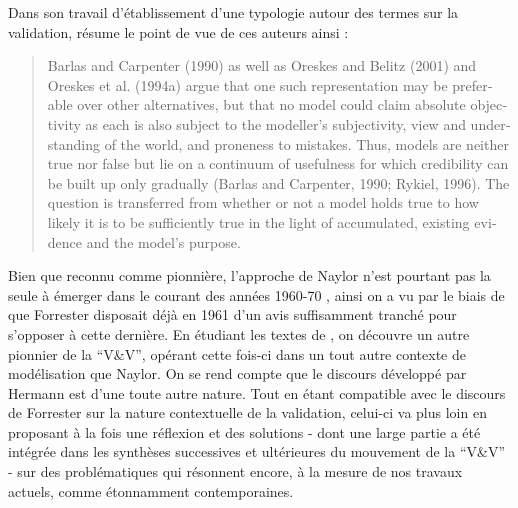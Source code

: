 Dans son travail d'établissement d'une typologie autour des termes sur la validation, \textcite{Augusiak2014} résume le point de vue de ces auteurs ainsi :

\foreignblockquote{english}[\cite{Augusiak2014}]{Barlas and Carpenter (1990) as well as Oreskes and Belitz (2001) and Oreskes et al. (1994a) argue that one such representation may be preferable over other alternatives, but that no model could claim absolute objectivity as each is also subject to the modeller’s subjectivity, view and understanding of the world, and proneness to mistakes. Thus, models are neither true nor false but lie on a continuum of usefulness for which credibility can be built up only gradually (Barlas and Carpenter, 1990; Rykiel, 1996). The question is transferred from whether or not a model holds true to how likely it is to be sufficiently true in the light of accumulated, existing evidence and the model’s purpose.}






Bien que reconnu comme pionnière, l'approche de Naylor n'est pourtant pas la seule à émerger dans le courant des années 1960-70 \autocite{Balci1980}, ainsi on a vu par le biais de \autocite{Barlas1990} que Forrester disposait déjà en 1961 d'un avis suffisamment tranché pour s'opposer à cette dernière. En étudiant les textes de \textcite{Hermann1967}, on découvre un autre pionnier de la \enquote{V\&V}, opérant cette fois-ci dans un tout autre contexte de modélisation que Naylor. On se rend compte que le discours développé par Hermann est d'une toute autre nature. Tout en étant compatible avec le discours de Forrester sur la nature contextuelle de la validation, celui-ci va plus loin en proposant à la fois une réflexion et des solutions - dont une large partie a été intégrée dans les synthèses successives et ultérieures du mouvement de la \enquote{V\&V} - sur des problématiques qui résonnent encore, à la mesure de nos travaux actuels, comme étonnamment contemporaines.
